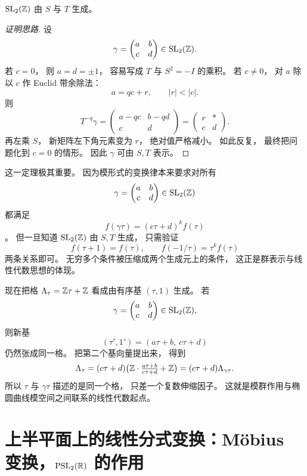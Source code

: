 \begin{theorem} $\mathrm{SL}_2(\mathbb{Z})$ 由 $S$ 与 $T$ 生成。 \end{theorem}




\begin{proof}[证明思路] 设 \[ \gamma= \begin{pmatrix} a&b\\ c&d \end{pmatrix}\in \mathrm{SL}_2(\mathbb{Z}). \] 若 $c=0$， 则 $a=d=\pm1$， 容易写成 $T$ 与 $S^2=-I$ 的乘积。 若 $c\ne0$， 对 $a$ 除以 $c$ 作 Euclid 带余除法： \[ a=qc+r,\qquad |r|<|c|. \] 则 \[ T^{-q}\gamma= \begin{pmatrix} a-qc&b-qd\\ c&d \end{pmatrix} = \begin{pmatrix} r&*\\ c&d \end{pmatrix}. \] 再左乘 $S$， 新矩阵左下角元素变为 $r$， 绝对值严格减小。 如此反复， 最终把问题化到 $c=0$ 的情形。 因此 $\gamma$ 可由 $S,T$ 表示。 \end{proof}




\begin{remark} 这一定理极其重要。 因为模形式的变换律本来要求对所有 \[ \gamma= \begin{pmatrix} a&b\\ c&d \end{pmatrix}\in \mathrm{SL}_2(\mathbb{Z}) \] 都满足 \[ f(\gamma\tau)=(c\tau+d)^k f(\tau) \]。 但一旦知道 $\mathrm{SL}_2(\mathbb{Z})$ 由 $S,T$ 生成， 只需验证 \[ f(\tau+1)=f(\tau), \qquad f(-1/\tau)=\tau^k f(\tau) \] 两条关系即可。 无穷多个条件被压缩成两个生成元上的条件， 这正是群表示与线性代数思想的体现。 \end{remark} 现在把格 $\Lambda_\tau=\mathbb{Z}\tau+\mathbb{Z}$ 看成由有序基 $(\tau,1)$ 生成。 若 \[ \gamma= \begin{pmatrix} a&b\\ c&d \end{pmatrix}\in \mathrm{SL}_2(\mathbb{Z}), \] 则新基 \[ (\tau',1')=(a\tau+b,\ c\tau+d) \] 仍然张成同一格。 把第二个基向量提出来， 得到 \[ \Lambda_\tau =(c\tau+d)\bigl(\mathbb{Z}\cdot \tfrac{a\tau+b}{c\tau+d}+\mathbb{Z}\bigr) =(c\tau+d)\Lambda_{\gamma\tau}. \] 所以 $\tau$ 与 $\gamma\tau$ 描述的是同一个格， 只差一个复数伸缩因子。 这就是模群作用与椭圆曲线模空间之间联系的线性代数起点。




\section{上半平面上的线性分式变换：Möbius 变换，$\mathrm{PSL}_2(\mathbb{R})$ 的作用}




